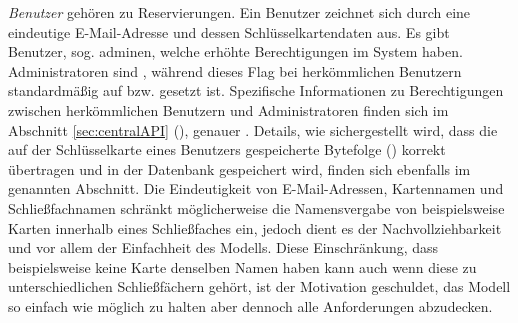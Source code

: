 \noindent
{}
\textit{Benutzer} gehören zu Reservierungen. Ein Benutzer zeichnet sich durch eine eindeutige E-Mail-Adresse und dessen Schlüsselkartendaten aus. Es gibt Benutzer, sog. \gls{admin}en, welche erhöhte Berechtigungen im System haben. Administratoren sind \frqq{}\flqq{}, während dieses Flag bei herkömmlichen Benutzern standardmäßig auf \frqq{}\flqq{} bzw. \frqq{}\flqq{} gesetzt ist. Spezifische Informationen zu Berechtigungen zwischen herkömmlichen Benutzern und Administratoren finden sich im Abschnitt \ref{sec:centralAPI} (), genauer \frqq{}\flqq{}. Details, wie sichergestellt wird, dass die auf der Schlüsselkarte eines Benutzers gespeicherte Bytefolge (\frqq{}\flqq{}) korrekt übertragen und in der Datenbank gespeichert wird, finden sich ebenfalls im genannten Abschnitt. 
Die Eindeutigkeit von E-Mail-Adressen, Kartennamen und Schließfachnamen schränkt möglicherweise die Namensvergabe von beispielsweise Karten innerhalb eines Schließfaches ein, jedoch dient es der Nachvollziehbarkeit und vor allem der Einfachheit des Modells. Diese Einschränkung, dass beispielsweise keine Karte denselben Namen haben kann auch wenn diese zu unterschiedlichen Schließfächern gehört, ist der Motivation geschuldet, das Modell so einfach wie möglich zu halten aber dennoch alle Anforderungen abzudecken.\bigskip

